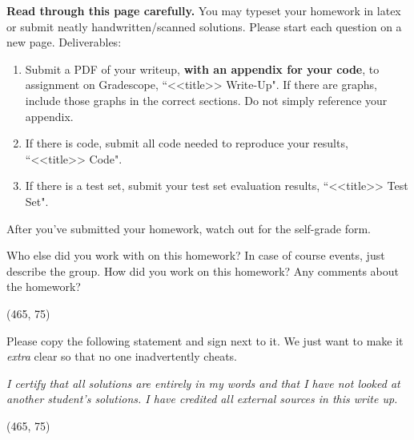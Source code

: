 \documentclass[preview]{standalone}
\begin{document}
\fontsize{12}{15}\selectfont


\textbf{Read through this page carefully.} You may typeset your homework in latex or submit neatly handwritten/scanned solutions. Please start each question on a new page. Deliverables:

\begin{enumerate}
  \item Submit a PDF of your writeup, \textbf{with an appendix for your code}, to assignment on Gradescope, ``<<title>> Write-Up". If there are graphs, include those graphs in the correct sections. Do not simply reference your appendix.
  \item If there is code, submit all code needed to reproduce your results, ``<<title>> Code".
  \item If there is a test set, submit your test set evaluation results, ``<<title>> Test Set".
\end{enumerate}

After you've submitted your homework, watch out for the self-grade form.

\begin{Parts}

\Part Who else did you work with on this homework? In case of course events, just describe the group. How did you work on this homework? Any comments about the homework?

\vspace{15pt}
\framebox(465, 75){}

\Part Please copy the following statement and sign next to it. We just want to make it \textit{extra} clear so that no one inadvertently cheats.

\textit{I certify that all solutions are entirely in my words and that I have not looked at another student's solutions. I have credited all external sources in this write up.}

\vspace{15pt}
\framebox(465, 75){}

\end{Parts}

\pagebreak


\end{document}
